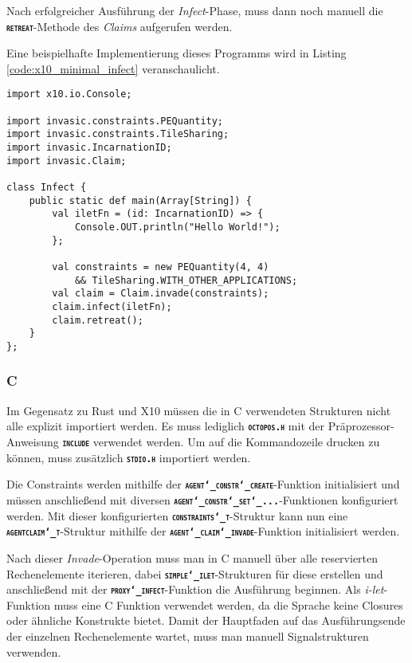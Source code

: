 Nach erfolgreicher Ausführung der \textit{Infect}-Phase, muss dann noch manuell die 
\texttt{\textsc{\textbf{retreat}}}-Methode des \textit{Claims} aufgerufen werden.

Eine beispielhafte Implementierung dieses Programms wird in Listing \ref{code:x10_minimal_infect} veranschaulicht.

\lstset{basicstyle=\small}
\begin{lstlisting}[float,caption={Minimales Invade, Infect, Retreat in X10},label=code:x10_minimal_infect]
import x10.io.Console;

import invasic.constraints.PEQuantity;
import invasic.constraints.TileSharing;
import invasic.IncarnationID;
import invasic.Claim;

class Infect {
    public static def main(Array[String]) {
        val iletFn = (id: IncarnationID) => {
            Console.OUT.println("Hello World!");
        };

        val constraints = new PEQuantity(4, 4)
            && TileSharing.WITH_OTHER_APPLICATIONS;
        val claim = Claim.invade(constraints);
        claim.infect(iletFn);
        claim.retreat();
    }
};
\end{lstlisting}
\lstset{basicstyle=\normalsize}

\subsubsection{C}

Im Gegensatz zu Rust und X10 müssen die in C verwendeten Strukturen nicht alle explizit importiert werden.
Es muss lediglich \texttt{\textsc{\textbf{octopos.h}}} mit der Präprozessor-Anweisung
\texttt{\textsc{\textbf{include}}} verwendet werden.
Um auf die Kommandozeile drucken zu können, muss zusätzlich \texttt{\textsc{\textbf{stdio.h}}} importiert werden.

Die Constraints werden mithilfe der \texttt{\textsc{\textbf{agent\char`_constr\char`_create}}}-Funktion initialisiert
und müssen anschließend mit diversen \texttt{\textsc{\textbf{agent\char`_constr\char`_set\char`_...}}}-Funktionen
konfiguriert werden.
Mit dieser konfigurierten \texttt{\textsc{\textbf{constraints\char`_t}}}-Struktur kann nun eine
\texttt{\textsc{\textbf{agentclaim\char`_t}}}-Struktur mithilfe
der \texttt{\textsc{\textbf{agent\char`_claim\char`_invade}}}-Funktion initialisiert werden.

Nach dieser \textit{Invade}-Operation muss man in C manuell über alle reservierten Rechenelemente iterieren, dabei
\texttt{\textsc{\textbf{simple\char`_ilet}}}-Strukturen für diese erstellen und anschließend mit der
\texttt{\textsc{\textbf{proxy\char`_infect}}}-Funktion
die Ausführung beginnen. Als \textit{i-let}-Funktion muss eine C Funktion verwendet werden,
da die Sprache keine Closures oder ähnliche Konstrukte bietet.
Damit der Hauptfaden auf das Ausführungsende der einzelnen Rechenelemente wartet, muss
man manuell Signalstrukturen verwenden.

